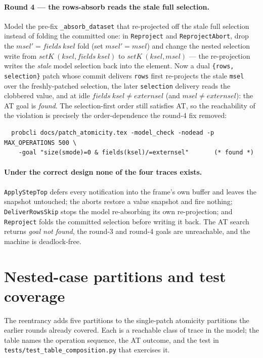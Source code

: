 \documentclass[a4paper,10pt,fleqn]{article}
\begin{document}
\paragraph{Round 4 --- the rows-absorb reads the stale full selection.}
Model the pre-fix \texttt{\_absorb\_dataset} that re-projected off the stale full
selection instead of folding the committed one: in \texttt{Reproject} and
\texttt{ReprojectAbort}, drop the $msel' = fields~ksel$ fold (set $msel' = msel$)
and change the nested selection write from $setK~(ksel, fields~ksel)$ to
$setK~(ksel, msel)$ --- the re-projection writes the \emph{stale} model selection
back into the element.  Now a dual \texttt{\{rows, selection\}} patch whose commit
delivers \texttt{rows} first re-projects the stale \texttt{msel} over the
freshly-patched selection, the later \texttt{selection} delivery reads the
clobbered value, and at idle $fields~ksel \neq externsel$ (and $msel \neq
externsel$): the AT goal is \emph{found}.  The selection-first order still
satisfies AT, so the reachability of the violation is precisely the
order-dependence the round-4 fix removed:
\begin{verbatim}
  probcli docs/patch_atomicity.tex -model_check -nodead -p MAX_OPERATIONS 500 \
    -goal "size(smode)=0 & fields(ksel)/=externsel"       (* found *)
\end{verbatim}

\paragraph{Under the correct design none of the four traces exists.}
\texttt{ApplyStepTop} defers every notification into the frame's own buffer and
leaves the snapshot untouched; the aborts restore a value snapshot and fire
nothing; \texttt{DeliverRowsSkip} stops the model re-absorbing its own
re-projection; and \texttt{Reproject} folds the committed selection before writing
it back.  The AT search returns \emph{goal not found}, the round-3 and round-4
goals are unreachable, and the machine is deadlock-free.

\section{Nested-case partitions and test coverage}
\label{sec:partition}

The reentrancy adds five partitions to the single-patch atomicity partitions the
earlier rounds already covered.  Each is a reachable class of trace in the model;
the table names the operation sequence, the AT outcome, and the test in
\texttt{tests/test\_table\_composition.py} that exercises it.
\end{document}
